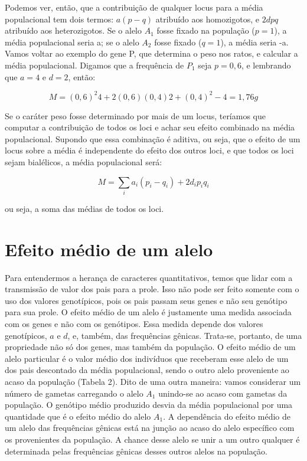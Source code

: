\documentclass[portuges,]{tufte-handout}
\begin{document}
Podemos ver, então, que a contribuição de qualquer locus para a média
populacional tem dois termos: $a(p-q)$ atribuído aos homozigotos, e
$2dpq$ atribuído aos heterozigotos. Se o alelo $A_1$ fosse fixado na
população ($p = 1$), a média populacional seria a; se o alelo $A_2$
fosse fixado ($q = 1$), a média seria -a. Vamos voltar ao exemplo do
gene P, que determina o peso nos ratos, e calcular a média populacional.
Digamos que a frequência de $P_1$ seja $p = 0,6$, e lembrando que
$a = 4$ e $d = 2$, então:

\[
M = (0,6)^2 4 + 2(0,6)(0,4) 2 + (0,4)^2 -4 = 1,76g
\]

Se o caráter peso fosse determinado por mais de um locus, teríamos que
computar a contribuição de todos os loci e achar seu efeito combinado na
média populacional. Supondo que essa combinação é aditiva, ou seja, que
o efeito de um locus sobre a média é independente do efeito dos outros
loci, e que todos os loci sejam bialélicos, a média populacional será:

\[
M = \sum_{i}a_i(p_i-q_i) + 2d_ip_iq_i
\]

ou seja, a soma das médias de todos os loci.

\section{Efeito médio de um alelo}\label{efeito-muxe9dio-de-um-alelo}

Para entendermos a herança de caracteres quantitativos, temos que lidar
com a transmissão de valor dos pais para a prole. Isso não pode ser
feito somente com o uso dos valores genotípicos, pois os pais passam
seus genes e não seu genótipo para sua prole. O efeito médio de um alelo
é justamente uma medida associada com os genes e não com os genótipos.
Essa medida depende dos valores genotípicos, $a$ e $d$, e, também, das
frequências gênicas. Trata-se, portanto, de uma propriedade não só dos
genes, mas também da população. O efeito médio de um alelo particular é
o valor médio dos indivíduos que receberam esse alelo de um dos pais
descontado da média populacional, sendo o outro alelo proveniente ao
acaso da população (Tabela 2). Dito de uma outra maneira: vamos
considerar um número de gametas carregando o alelo $A_1$ unindo-se ao
acaso com gametas da população. O genótipo médio produzido desvia da
média populacional por uma quantidade que é o efeito médio do alelo
$A_1$. A dependência do efeito médio de um alelo das frequências gênicas
está na junção ao acaso do alelo específico com os provenientes da
população. A chance desse alelo se unir a um outro qualquer é
determinada pelas frequências gênicas desses outros alelos na população.
\end{document}

